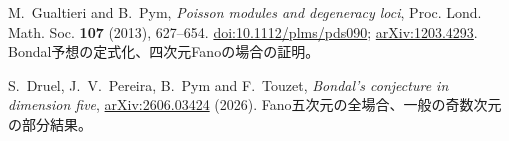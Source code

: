 M.~Gualtieri and B.~Pym,
\emph{Poisson modules and degeneracy loci},
Proc. Lond. Math. Soc. \textbf{107} (2013), 627--654.
\href{https://doi.org/10.1112/plms/pds090}{doi:10.1112/plms/pds090};
\href{https://arxiv.org/abs/1203.4293}{arXiv:1203.4293}.
Bondal予想の定式化、四次元Fanoの場合の証明。

S.~Druel, J.~V.~Pereira, B.~Pym and F.~Touzet,
\emph{Bondal's conjecture in dimension five},
\href{https://arxiv.org/abs/2606.03424}{arXiv:2606.03424} (2026).
Fano五次元の全場合、一般の奇数次元の部分結果。
